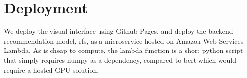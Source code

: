 \section{Deployment}

We deploy the visual interface using Github Pages, and deploy the backend recommendation model, \gls{rfs}, as a microservice hosted on Amazon Web Services Lambda. As  is cheap to compute, the lambda function is a short python script that simply requires numpy as a dependency, compared to \acrshort{bert} which would require a hosted GPU solution.